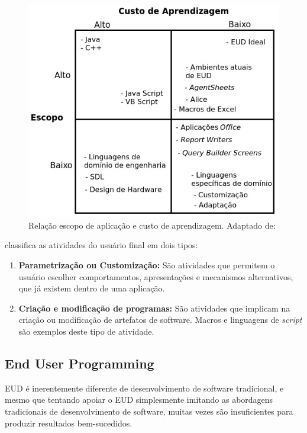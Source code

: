 \begin{figure}[h]
	\centering
	\label{fig01}
		\includegraphics[scale=0.8]{figuras/trade_off_eud_editado}
	\caption{Relação escopo de aplicação e custo de aprendizagem. Adaptado de: \cite{fischer2004}}
\end{figure}
\pagebreak

 classifica as atividades do usuário final em dois tipos:

\begin{enumerate}
\item \textbf{Parametrização ou Customização:} São atividades que permitem o usuário escolher comportamentos, apresentações e mecanismos  alternativos, que já existem dentro de uma aplicação.

\item \textbf{Criação e modificação de programas:} São atividades que implicam na criação ou modificação de artefatos de software. Macros e linguagens de \textit{script} são exemplos deste tipo de atividade.
\end{enumerate}

\subsection{End User Programming}

EUD é inerentemente diferente de desenvolvimento de software tradicional, e mesmo que tentando apoiar o EUD simplesmente imitando as abordagens tradicionais de desenvolvimento de software, muitas vezes são insuficientes para produzir resultados bem-sucedidos.

